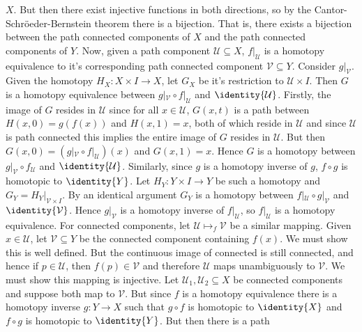 \documentclass{article}                                                        %
\begin{document}
\begin{solution}
        $X$. But then there exist injective functions in both directions, so by
        the Cantor-Schr\"{o}eder-Bernstein theorem there is a bijection. That
        is, there exists a bijection between the path connected components
        of $X$ and the path connected components of $Y$. Now, given a path
        component $\mathcal{U}\subseteq{X}$, $f|_{\mathcal{U}}$ is a homotopy
        equivalence to it's corresponding path connected component
        $\mathcal{V}\subseteq{Y}$. Consider $g|_{\mathcal{V}}$. Given the
        homotopy $H_{X}:X\times{I}\rightarrow{X}$, let $G_{X}$ be it's
        restriction to $\mathcal{U}\times{I}$. Then $G$ is a homotopy
        equivalence between $g|_{\mathcal{V}}\circ{f}|_{\mathcal{U}}$ and
        $\identity{\mathcal{U}}$. Firstly, the image of $G$ resides in
        $\mathcal{U}$ since for all $x\in\mathcal{U}$, $G(x,t)$ is a path
        between $H(x,0)=g(f(x))$ and $H(x,1)=x$, both of which reside in
        $\mathcal{U}$ and since $\mathcal{U}$ is path connected this implies the
        entire image of $G$ resides in $\mathcal{U}$. But then
        $G(x,0)=(g|_{\mathcal{V}}\circ{f}|_{\mathcal{U}})(x)$ and $G(x,1)=x$.
        Hence $G$ is a homotopy between $g|_{\mathcal{V}}\circ{f}_{\mathcal{U}}$
        and $\identity{\mathcal{U}}$. Similarly, since $g$ is a homotopy inverse
        of $g$, $f\circ{g}$ is homotopic to $\identity{Y}$. Let
        $H_{Y}:Y\times{I}\rightarrow{Y}$ be such a homotopy and
        $G_{Y}=H_{Y}|_{\mathcal{V}\times{I}}$. By an identical argument $G_{Y}$
        is a homotopy between $f|_{\mathcal{U}}\circ{g}|_{\mathcal{V}}$ and
        $\identity{\mathcal{V}}$. Hence $g|_{\mathcal{V}}$ is a homotopy inverse
        of $f|_{\mathcal{U}}$, so $f|_{\mathcal{U}}$ is a homotopy equivalence.
        For connected components, let $\mathcal{U}\mapsto_{f}\mathcal{V}$ be a
        similar mapping. Given $x\in\mathcal{U}$, let $\mathcal{V}\subseteq{Y}$
        be the connected component containing $f(x)$. We must show this is well
        defined. But the continuous image of connected is still connected, and
        hence if $p\in\mathcal{U}$, then $f(p)\in\mathcal{V}$ and therefore
        $\mathcal{U}$ maps unambiguously to $\mathcal{V}$. We must show this
        mapping is injective. Let $\mathcal{U}_{1},\mathcal{U}_{2}\subseteq{X}$
        be connected components and suppose both map to $\mathcal{V}$. But since
        $f$ is a homotopy equivalence there is a homotopy inverse
        $g:Y\rightarrow{X}$ such that $g\circ{f}$ is homotopic to $\identity{X}$
        and $f\circ{g}$ is homotopic to $\identity{Y}$. But then there is a path

\end{solution}
\end{document}
